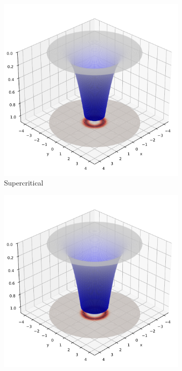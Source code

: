 \documentclass[12pt]{article}
\begin{document}
\begin{figure}[H]
  \begin{subfigure}[b]{0.3\textwidth}
    \includegraphics[width=\textwidth]{frame_105_supercritical.pdf}
    \caption{Supercritical}
  \end{subfigure}
  \hfill
  \begin{subfigure}[b]{0.3\textwidth}
    \includegraphics[width=\textwidth]{frame_125_photosphere_visible.pdf}

\end{subfigure}
\end{figure}
\end{document}
